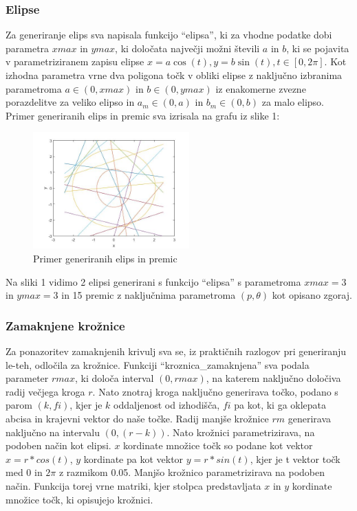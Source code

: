\documentclass[a4paper]{article}
\begin{document}
\subsubsection{Elipse}
Za generiranje elips sva napisala funkcijo ``elipsa'', ki za vhodne podatke dobi parametra $xmax$ in $ymax$, ki določata največji možni števili $a$ in $b$, ki se pojavita v parametriziranem zapisu elipse $x=a \cos(t), y=b \sin(t), t\in [0, 2\pi]$. Kot izhodna parametra vrne dva poligona točk v obliki elipse z naključno izbranima parametroma $a \in (0, xmax)$ in $b \in (0, ymax)$ iz enakomerne zvezne porazdelitve za veliko elipso in $a_m \in (0, a)$ in $b_m \in (0, b)$ za malo elipso. Primer generiranih elips in premic sva izrisala na grafu iz slike 1:


\begin{figure}[h]
\centering
\includegraphics[width=60mm]{graf_primer.jpg}
\caption{Primer generiranih elips in premic \label{overflow}}
\end{figure} 

Na sliki 1 vidimo 2 elipsi generirani s funkcijo ``elipsa'' s parametroma $xmax=3$ in $ymax=3$ in 15 premic z naključnima parametroma $(p, \theta)$ kot opisano zgoraj. 

\subsubsection{Zamaknjene krožnice}

Za ponazoritev zamaknjenih krivulj sva se, iz praktičnih razlogov pri generiranju le-teh, odločila za krožnice. Funkciji ``kroznica\_zamaknjena'' sva podala parameter $rmax$, ki določa interval $(0,rmax)$, na katerem naključno določiva radij večjega kroga $r$. Nato znotraj kroga naključno generirava točko, podano s parom $(k,fi)$, kjer je $k$ oddaljenost od izhodišča, $fi$ pa kot, ki ga oklepata abcisa in krajevni vektor do naše točke. Radij manjše krožnice $rm$ generirava naključno na intervalu $(0,(r-k))$. Nato krožnici parametrizirava, na podoben način kot elipsi. $x$ kordinate množice točk so podane kot vektor $x = r*cos(t)$, $y$ kordinate pa kot vektor $y = r*sin(t)$, kjer je t vektor točk med 0 in $2\pi$ z razmikom 0.05. Manjšo krožnico parametrizirava na podoben način. Funkcija torej vrne matriki, kjer stolpca predstavljata $x$ in $y$ kordinate množice točk, ki opisujejo krožnici. 
\end{document}
